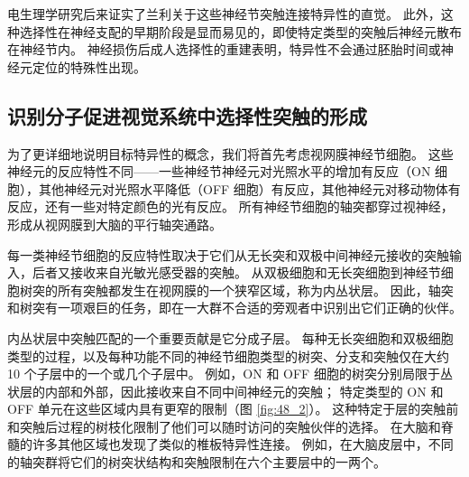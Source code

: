 电生理学研究后来证实了兰利关于这些神经节突触连接特异性的直觉。 此外，这种选择性在神经支配的早期阶段是显而易见的，即使特定类型的突触后神经元散布在神经节内。 神经损伤后成人选择性的重建表明，特异性不会通过胚胎时间或神经元定位的特殊性出现。

\subsection{识别分子促进视觉系统中选择性突触的形成}
为了更详细地说明目标特异性的概念，我们将首先考虑视网膜神经节细胞。 这些神经元的反应特性不同——一些神经节神经元对光照水平的增加有反应（ON 细胞），其他神经元对光照水平降低（OFF 细胞）有反应，其他神经元对移动物体有反应，还有一些对特定颜色的光有反应。 所有神经节细胞的轴突都穿过视神经，形成从视网膜到大脑的平行轴突通路。

每一类神经节细胞的反应特性取决于它们从无长突和双极中间神经元接收的突触输入，后者又接收来自光敏光感受器的突触。 从双极细胞和无长突细胞到神经节细胞树突的所有突触都发生在视网膜的一个狭窄区域，称为内丛状层。 因此，轴突和树突有一项艰巨的任务，即在一大群不合适的旁观者中识别出它们正确的伙伴。

内丛状层中突触匹配的一个重要贡献是它分成子层。 每种无长突细胞和双极细胞类型的过程，以及每种功能不同的神经节细胞类型的树突、分支和突触仅在大约 10 个子层中的一个或几个子层中。 
例如，ON 和 OFF 细胞的树突分别局限于丛状层的内部和外部，因此接收来自不同中间神经元的突触； 特定类型的 ON 和 OFF 单元在这些区域内具有更窄的限制（图 \ref{fig:48_2}）。 
这种特定于层的突触前和突触后过程的树枝化限制了他们可以随时访问的突触伙伴的选择。 在大脑和脊髓的许多其他区域也发现了类似的椎板特异性连接。 例如，在大脑皮层中，不同的轴突群将它们的树突状结构和突触限制在六个主要层中的一两个。

